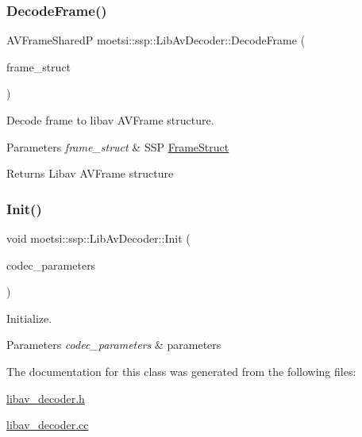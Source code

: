 \subsubsection{\texorpdfstring{Decode\+Frame()}{DecodeFrame()}}
{\footnotesize\ttfamily A\+V\+Frame\+SharedP moetsi\+::ssp\+::\+Lib\+Av\+Decoder\+::\+Decode\+Frame (\begin{DoxyParamCaption}\item[{\hyperlink{structmoetsi_1_1ssp_1_1FrameStruct}{Frame\+Struct} \&}]{frame\+\_\+struct }\end{DoxyParamCaption})}



Decode frame to libav A\+V\+Frame structure. 


\begin{DoxyParams}{Parameters}
{\em frame\+\_\+struct} & S\+SP \hyperlink{structmoetsi_1_1ssp_1_1FrameStruct}{Frame\+Struct} \\
\hline
\end{DoxyParams}
\begin{DoxyReturn}{Returns}
Libav A\+V\+Frame structure 
\end{DoxyReturn}
\mbox{\label{classmoetsi_1_1ssp_1_1LibAvDecoder_a631ce4158ab4f456a26951674f96a803}} 
\subsubsection{\texorpdfstring{Init()}{Init()}}
{\footnotesize\ttfamily void moetsi\+::ssp\+::\+Lib\+Av\+Decoder\+::\+Init (\begin{DoxyParamCaption}\item[{A\+V\+Codec\+Parameters $\ast$}]{codec\+\_\+parameters }\end{DoxyParamCaption})}



Initialize. 


\begin{DoxyParams}{Parameters}
{\em codec\+\_\+parameters} & parameters \\
\hline
\end{DoxyParams}


The documentation for this class was generated from the following files\+:\begin{DoxyCompactItemize}
\item 
\hyperlink{libav__decoder_8h}{libav\+\_\+decoder.\+h}\item 
\hyperlink{libav__decoder_8cc}{libav\+\_\+decoder.\+cc}\end{DoxyCompactItemize}

